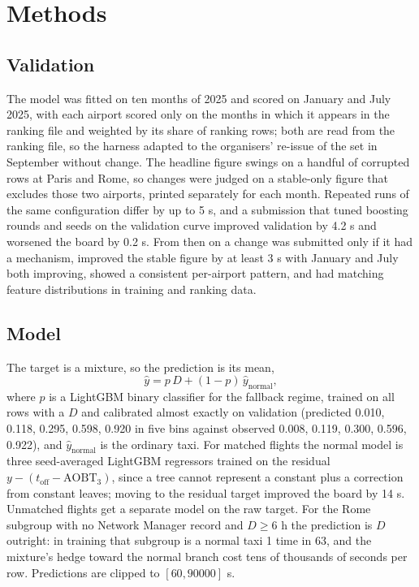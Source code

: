 \documentclass[
  manuscript=article,
  layout=preprint,
  year=2027,
  volume=x,
]{extra/joas}
\begin{document}
\section{Methods}

\subsection{Validation}

The model was fitted on ten months of 2025 and scored on January and July 2025, with each airport scored only on the months in which it appears in the ranking file and weighted by its share of ranking rows; both are read from the ranking file, so the harness adapted to the organisers' re-issue of the set in September without change. The headline figure swings on a handful of corrupted rows at Paris and Rome, so changes were judged on a stable-only figure that excludes those two airports, printed separately for each month. Repeated runs of the same configuration differ by up to 5 s, and a submission that tuned boosting rounds and seeds on the validation curve improved validation by 4.2 s and worsened the board by 0.2 s. From then on a change was submitted only if it had a mechanism, improved the stable figure by at least 3 s with January and July both improving, showed a consistent per-airport pattern, and had matching feature distributions in training and ranking data.

\subsection{Model}

The target is a mixture, so the prediction is its mean,
\begin{equation} \label{eq:mixture}
\hat{y} = p\,D + (1 - p)\,\hat{y}_{\mathrm{normal}},
\end{equation}
where $p$ is a LightGBM \cite{ke2017lightgbm} binary classifier for the fallback regime, trained on all rows with a $D$ and calibrated almost exactly on validation (predicted 0.010, 0.118, 0.295, 0.598, 0.920 in five bins against observed 0.008, 0.119, 0.300, 0.596, 0.922), and $\hat{y}_{\mathrm{normal}}$ is the ordinary taxi. For matched flights the normal model is three seed-averaged LightGBM regressors trained on the residual $y - (t_{\mathrm{off}} - \mathrm{AOBT}_3)$, since a tree cannot represent a constant plus a correction from constant leaves; moving to the residual target improved the board by 14 s. Unmatched flights get a separate model on the raw target. For the Rome subgroup with no Network Manager record and $D \ge 6$ h the prediction is $D$ outright: in training that subgroup is a normal taxi 1 time in 63, and the mixture's hedge toward the normal branch cost tens of thousands of seconds per row. Predictions are clipped to $[60, 90000]$ s.
\end{document}
